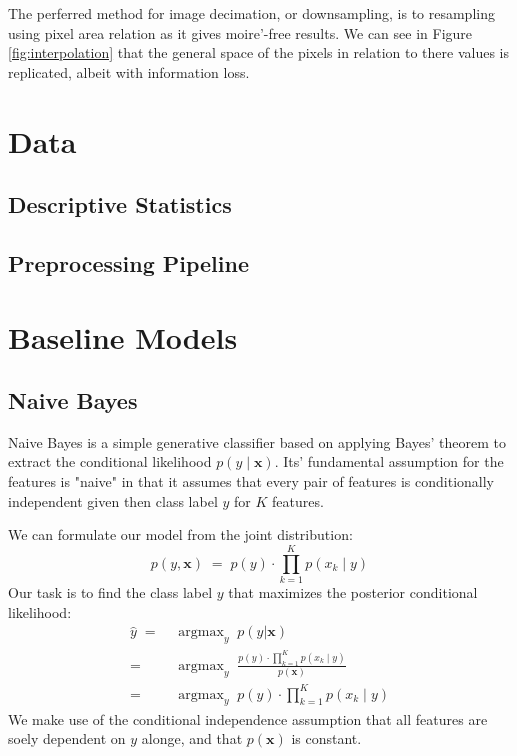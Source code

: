 \documentclass{article}
\DeclareMathOperator*{\argmax}{argmax}
\begin{document}
The perferred method for image decimation, or downsampling, is to
resampling using pixel area relation as it gives moire'-free results. We can
see in Figure \ref{fig:interpolation} that the general space of the pixels in
relation to there values is replicated, albeit with information loss.



\section{Data}
\label{sec:data}
\subsection{Descriptive Statistics}
\label{sec:stats}
\subsection{Preprocessing Pipeline}
\label{sec:pipeline}



\section{Baseline Models}
\label{sec:baseline-models}
\subsection{Naive Bayes}
\label{sec:NB}
Naive Bayes is a simple generative classifier based on applying Bayes' theorem
to extract the conditional likelihood $p(y \mid \mathbf{x})$. Its' fundamental
assumption for the features is "naive" in that it assumes that every pair of
features is conditionally independent given then class label $y$ for $K$ features.

We can formulate our model from the joint distribution:
\begin{equation}
    p(y, \mathbf{x}) \; = \; p(y) \cdot \prod_{k=1}^K p(x_k \mid y)
\end{equation}
Our task is to find the class label $y$ that maximizes the posterior conditional
likelihood:
\begin{equation}
  \begin{aligned}
    \hat{y} \; = \; & \argmax_y \; p(y | \mathbf{x}) \\
    = \; & \argmax_y \; \frac{p(y) \cdot \prod_{k=1}^K p(x_k \mid y)}{p(\mathbf{x})} \\
    = \; & \argmax_y \; p(y) \cdot \prod_{k=1}^K p(x_k \mid y)
  \end{aligned}
\end{equation}
We make use of the conditional independence assumption that all features
are soely dependent on $y$ alonge, and that $p(\mathbf{x})$ is constant.
\end{document}

